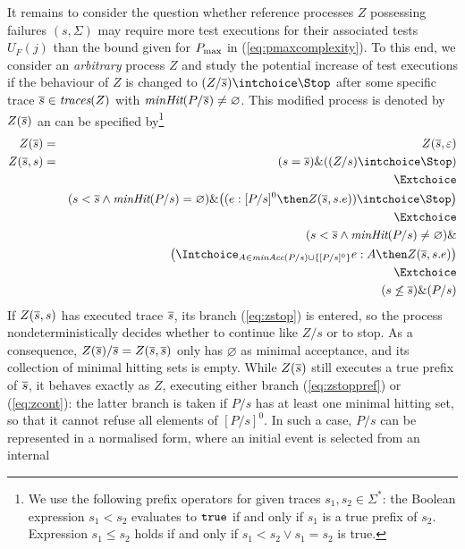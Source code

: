 It remains to 
consider the question whether reference processes $Z$ possessing failures $(s,\Sigma)$
may require more test executions for their associated tests $U_F(j)$ than the bound
given for $P_\text{max}$ in (\ref{eq:pmaxcomplexity}). To this end, we consider an {\it arbitrary} process  $Z$ and study the potential increase of test executions if
the behaviour of $Z$ is changed to $(Z/\ol s)\intchoice \Stop$ after some specific 
trace $\overline s\in\text{\it traces}(Z)$ with $\text{\it minHit}(P/\overline s) \neq \varnothing$. This modified process is denoted by $Z({\overline s})$
an can be specified by\footnote{We use the following prefix operators
for given   traces $s_1,s_2\in\Sigma^*$: the Boolean 
expression $ s_1 < s_2$ evaluates to $\mbox{{\tt true}}$ if and only if $s_1$ is a true prefix of $s_2$. Expression $s_1\le s_2$ holds if and only if $ s_1 < s_2 \vee s_1 = s_2$ is true.}
\begin{eqnarray}
Z({\ol s}) & = & Z({\ol s},\varepsilon)
\\
\label{eq:zstop}
Z(\ol s,s) & = & (s = \ol s) \& ((Z/s)\intchoice \Stop)
\\ & & \Extchoice    \nonumber
\\  
\label{eq:zstoppref}
& & (s < \ol s \wedge \minhits(P/s) = \varnothing) \& 
\big(  (e:[P/s]^0 \then  Z(\ol s, s.e)) \intchoice \Stop \big)
\\ & & \Extchoice   \nonumber
\\ 
\label{eq:zcont}
& &           (s < \ol s\wedge \minhits(P/s) \neq \varnothing ) \& 
\\ & & \nonumber
\big(\Intchoice_{A\in\minaccs(P/s)\cup \{ [P/s]^0 \}}
e : A \then Z(\ol s, s.e)          \big)
\\ & & \Extchoice   \nonumber
\\
\label{eq:zlikep}
& & (s \not\le \ol s) \& (P/s)
\end{eqnarray}
%
If $Z(\overline s,s)$ has executed trace $\overline s$, its branch (\ref{eq:zstop}) is entered, 
so the process 
nondeterministically decides whether to continue like $Z/s$ or to stop. As a consequence,
$Z(\overline s)/\overline s = Z(\overline s,\overline s)$ only has $\varnothing$ as minimal acceptance, and its
  collection of minimal hitting sets is empty.
 While $Z(\overline s)$ still executes a true prefix
of $\overline s$, it behaves exactly as $Z$, executing either branch (\ref{eq:zstoppref}) or
(\ref{eq:zcont}): the latter branch is taken if $P/s$ has at least one minimal hitting set,
so that it cannot refuse all elements of $[P/s]^0$. In such a case, $P/s$ can be
represented in a normalised form, where an initial event is selected from an internal
